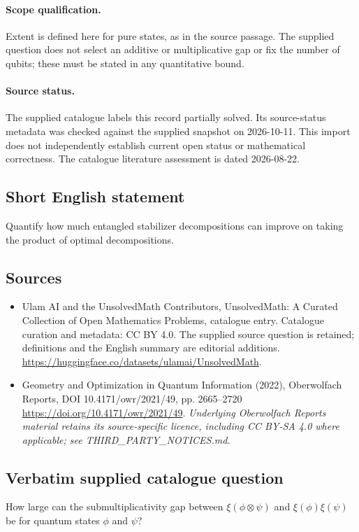 \documentclass[11pt]{article}
\begin{document}
\paragraph{Scope qualification.}
Extent is defined here for pure states, as in the source passage. The supplied question does not select an additive or multiplicative gap or fix the number of qubits; these must be stated in any quantitative bound.
\paragraph{Source status.}
The supplied catalogue labels this record partially solved. Its source-status metadata was checked against the supplied snapshot on 2026-10-11. This import does not independently establish current open status or mathematical correctness. The catalogue literature assessment is dated 2026-08-22.
\subsection{Short English statement}
Quantify how much entangled stabilizer decompositions can improve on taking the product of optimal decompositions.
\subsection{Sources}
\begin{itemize}
\item[S1] Ulam AI and the UnsolvedMath Contributors, UnsolvedMath: A Curated Collection of Open Mathematics Problems, catalogue entry. Catalogue curation and metadata: CC BY 4.0. The supplied source question is retained; definitions and the English summary are editorial additions.
\url{https://huggingface.co/datasets/ulamai/UnsolvedMath}.
\item[S2] Geometry and Optimization in Quantum Information (2022), Oberwolfach Reports, DOI 10.4171/owr/2021/49, pp. 2665--2720
\url{https://doi.org/10.4171/owr/2021/49}.
\textit{Underlying Oberwolfach Reports material retains its source-specific licence, including CC BY-SA 4.0 where applicable; see THIRD\_PARTY\_NOTICES.md.}
\end{itemize}
\subsection{Verbatim supplied catalogue question}
How large can the submultiplicativity gap between $\xi(\phi\otimes\psi)$ and $\xi(\phi)\xi(\psi)$ be for quantum states $\phi$ and $\psi$?
\end{document}
